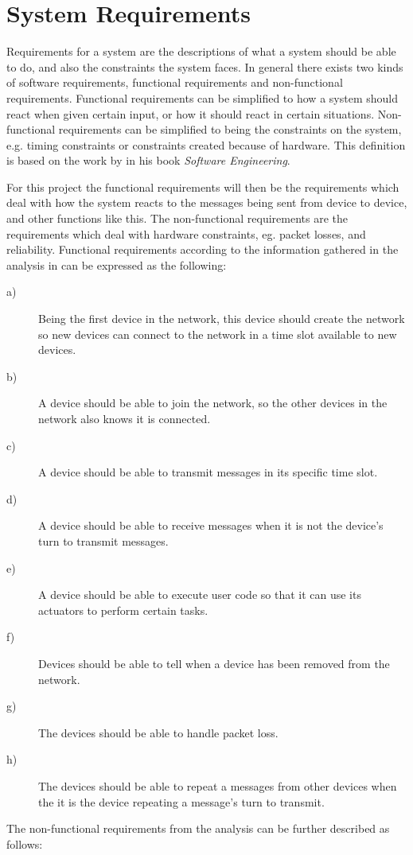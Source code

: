 \section{System Requirements}\label{requirements}
Requirements for a system are the descriptions of what a system should be able to do, and also the constraints the system faces.
In general there exists two kinds of software requirements, functional requirements and non-functional requirements. 
Functional requirements can be simplified to how a system should react when given certain input, or how it should react in certain situations.
Non-functional requirements can be simplified to being the constraints on the system, e.g. timing constraints or constraints created because of hardware.
This definition is based on the work by \citet[see][chapter 4]{SEBook} in his book \textit{Software Engineering}. 

For this project the functional requirements will then be the requirements which deal with how the system reacts to the messages being sent from device to device, and other functions like this.
The non-functional requirements are the requirements which deal with hardware constraints, eg. packet losses, and reliability.
Functional requirements according to the information gathered in the analysis in  can be expressed as the following: 


\begin{description}
    \item[a)] Being the first device in the network, this device should create the network so new devices can connect to the network in a time slot available to new devices.
    \item[b)] A device should be able to join the network, so the other devices in the network also knows it is connected.
    \item[c)] A device should be able to transmit messages in its specific time slot.
    \item[d)] A device should be able to receive messages when it is not the device's turn to transmit messages.
    \item[e)] A device should be able to execute user code so that it can use its actuators to perform certain tasks.
    \item[f)] Devices should be able to tell when a device has been removed from the network.
    \item[g)] The devices should be able to handle packet loss.
    \item[h)] The devices should be able to repeat a messages from other devices when the it is the device repeating a message's turn to transmit.
\end{description} 
\bigskip
The non-functional requirements from the analysis can be further described as follows:

